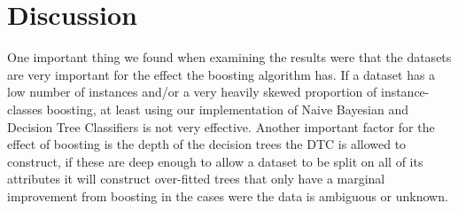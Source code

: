 \section{Discussion}\label{discussion}
One important thing we found when examining the results were that the datasets 
are very important for the effect the boosting algorithm has. If a dataset has 
a low number of instances and/or a very heavily skewed proportion of 
instance-classes boosting, at least using our implementation of Naive Bayesian 
and Decision Tree Classifiers is not very effective.
Another important factor for the effect of boosting is the depth of the 
decision trees the DTC is allowed to construct, if these are deep enough to 
allow a dataset to be split on all of its attributes it will construct 
over-fitted trees that only have a marginal improvement from boosting in the 
cases were the data is ambiguous or unknown.